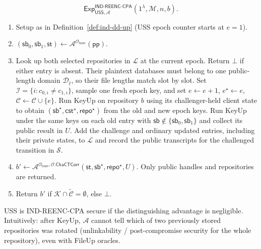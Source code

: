 \begin{definition}
\label{def:ind-reenc-cpa}
\par{}
\[
\mathsf{Exp}^{\mathsf{IND\text{-}REENC\text{-}CPA}}_{\mathsf{USS},\mathcal{A}}(1^\lambda,\mathcal{M},n,b).
\]
\begin{enumerate}
  \item Setup as in Definition~\ref{def:ind-dd-up} (USS epoch counter starts at $e=1$).
  \item $(\mathsf{sb}_0,\mathsf{sb}_1,\mathsf{st})\gets\mathcal{A}^{\mathcal O_{\mathrm{base}}}(\mathsf{pp})$.
  \item Look up both selected repositories in $\mathcal L$ at the current epoch. Return $\bot$ if either entry is absent.
        Their plaintext databases must belong to one public-length domain $\mathcal D_{\bar\ell}$, so their file lengths match slot by slot. Set $\mathcal{I}=\{i:c_{0,i}\neq c_{1,i}\}$, sample one fresh epoch key, and set $e\leftarrow e+1$, $e^\star\leftarrow e$, $\mathcal{C}\leftarrow\mathcal{C}\cup\{e\}$.
        Run KeyUp on repository $b$ using its challenger-held client state to obtain $(\mathsf{sb}^\star,\mathsf{cst}^\star,\mathsf{repo}^\star)$ from the old and new epoch keys. Run KeyUp under the same keys on each old entry with $\mathsf{sb}\notin\{\mathsf{sb}_0,\mathsf{sb}_1\}$ and collect its public result in $U$. Add the challenge and ordinary updated entries, including their private states, to $\mathcal L$ and record the public transcripts for the challenged transition in $\mathcal S$.
  \item $b'\gets\mathcal{A}^{\mathcal O_{\mathrm{base}},\mathcal{O}.\mathsf{ChaCTCorr}}(\mathsf{st},\mathsf{sb}^\star,\mathsf{repo}^\star,U)$. Only public handles and repositories are returned.
  \item Return $b'$ if $\mathcal{K}\cap\tilde{\mathcal{C}}=\emptyset$, else $\bot$.
\end{enumerate}
USS is IND-REENC-CPA secure if the distinguishing advantage is negligible.
Intuitively: after KeyUp, $\mathcal{A}$ cannot tell which of two previously stored repositories was rotated (unlinkability / post-compromise security for the whole repository), even with FileUp oracles.
\end{definition}

